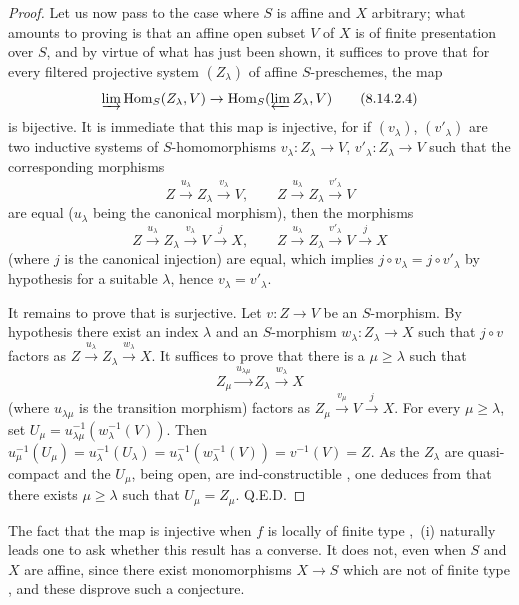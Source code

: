 \begin{proof}
Let us now pass to the case where $S$ is affine and $X$ arbitrary; what amounts to proving is that an affine open subset $V$ of $X$ is of finite presentation over $S$, and by virtue of what has just been shown, it suffices to prove that for every filtered projective system $(Z_\lambda)$ of affine $S$-preschemes, the map
\begin{equation}
\label{IV.8.14.2.4}
\varinjlim\operatorname{Hom}_S(Z_\lambda,V)\to\operatorname{Hom}_S(\varprojlim Z_\lambda,V) \tag{8.14.2.4}
\end{equation}
is bijective.
It is immediate that this map is injective, for if $(v_\lambda)$, $(v'_\lambda)$ are two inductive systems of $S$-homomorphisms $v_\lambda:Z_\lambda\to V$, $v'_\lambda:Z_\lambda\to V$ such that the corresponding morphisms
\[
Z\xrightarrow{u_\lambda}Z_\lambda\xrightarrow{v_\lambda}V,\qquad
Z\xrightarrow{u_\lambda}Z_\lambda\xrightarrow{v'_\lambda}V
\]
are equal ($u_\lambda$ being the canonical morphism), then the morphisms
\[
Z\xrightarrow{u_\lambda}Z_\lambda\xrightarrow{v_\lambda}V\xrightarrow{j}X,\qquad Z\xrightarrow{u_\lambda}Z_\lambda\xrightarrow{v'_\lambda}V\xrightarrow{j}X
\]
(where $j$ is the canonical injection) are equal, which implies $j\circ v_\lambda=j\circ v'_\lambda$ by hypothesis for a suitable $\lambda$, hence $v_\lambda=v'_\lambda$.


It remains to prove that  is surjective.
Let $v:Z\to V$ be an $S$-morphism.
By hypothesis there exist an index $\lambda$ and an $S$-morphism
$w_\lambda:Z_\lambda\to X$ such that $j\circ v$ factors as $Z\xrightarrow{u_\lambda}Z_\lambda\xrightarrow{w_\lambda}X$.
It suffices to prove that there is a $\mu\geqslant\lambda$ such that
\[
 Z_\mu\xrightarrow{u_{\lambda\mu}}Z_\lambda\xrightarrow{w_\lambda}X
\]
(where $u_{\lambda\mu}$ is the transition morphism) factors as $Z_\mu\xrightarrow{v_\mu}V\xrightarrow{j}X$.
For every $\mu\geqslant\lambda$, set
$U_\mu=u_{\lambda\mu}^{-1}(w_\lambda^{-1}(V))$.
Then $u_\mu^{-1}(U_\mu)=u_\lambda^{-1}(U_\lambda)
=u_\lambda^{-1}(w_\lambda^{-1}(V))=v^{-1}(V)=Z$.
As the $Z_\lambda$ are quasi-compact and the $U_\mu$, being open, are
ind-constructible , one deduces from  that there exists
$\mu\geqslant\lambda$ such that $U_\mu=Z_\mu$. Q.E.D.
\end{proof}

\begin{remark}[8.14.3]
\label{IV.8.14.3}
The fact that the map  is injective when $f$ is locally of finite
type ,~(i) naturally leads one to ask whether this result has a converse.
It does not, even when $S$ and $X$ are affine, since there exist monomorphisms
$X\to S$ which are not of finite type , and these disprove such a
conjecture.
\end{remark}
